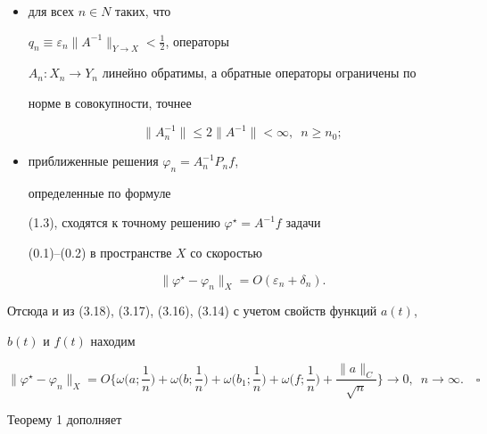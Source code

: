 \begin{itemize}


\item[a)] для всех $n\in N$ таких, что 


$q_n\equiv\varepsilon_n\| A^{-1}\|_{Y\to X}<\frac{1}{2}$, операторы


$A_n:X_n\to Y_n$ линейно обратимы, а обратные операторы ограничены по 


норме в совокупности, точнее


\begin{equation}


\| A_n^{-1}\|\leq 2\| A^{-1}\|<\infty, \ \; n\geq n_0;


\end{equation}


\item[б)] приближенные решения $\varphi_n=A_n^{-1}P_nf$,


определенные по формуле


(1.3), сходятся к точному решению $\varphi^\star=A^{-1}f$ задачи


(0.1)--(0.2) в пространстве $X$ со скоростью


$$


\|\varphi^{\star}-\varphi_n\|_X=O(\varepsilon_n+\delta_n). 


$$


\end{itemize}





Отсюда и из (3.18), (3.17), (3.16), (3.14) с учетом свойств функций $a(t)$, 


$b(t)$ и $f(t)$ находим


\begin{equation}


\|\varphi^{\star}-\varphi_n\|_X=O\bigg\{\omega\bigg(a;\frac{1}{n}\bigg)+


\omega\bigg(b;\frac{1}{n}\bigg)+\omega\bigg(b_1;\frac{1}{n}\bigg)+


\omega\bigg(f;\frac{1}{n}\bigg)+


\frac{\| a\|_C}{\sqrt{n}}\bigg\}\to 0, \ \; n\to\infty. \quad\square


\end{equation}





Теорему 1 дополняет


 


